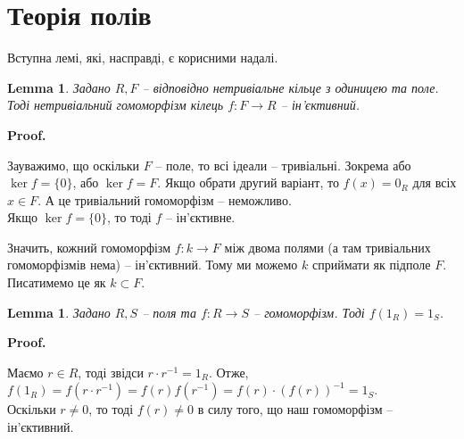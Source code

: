 \documentclass[a4paper, 10pt]{article}
\makeatletter
\theoremstyle{theoremdd}
\theoremstyle{theoremdd}
\theoremstyle{theoremdd}
\theoremstyle{theoremdd}
\theoremstyle{theoremdd}
\theoremstyle{theoremdd}
\theoremstyle{theoremdd}
\theoremstyle{theoremdd}
\theoremstyle{theoremdd}
\theoremstyle{theoremdd}
\theoremstyle{theoremdd}
\theoremstyle{theoremdd}
\theoremstyle{theoremdd}
\newtheorem{lemma}[theorem]{Lemma}
\theoremstyle{theoremdd}
\theoremstyle{theoremdd}
\renewenvironment{proof}[1][Proof.\\]{\par
\pushQED{\hfill \qed}%
\normalfont \topsep6\p@\@plus6\p@\relax
\trivlist
\item\relax
{\bfseries
#1\@addpunct{.}}\hspace\labelsep\ignorespaces
}{%
\popQED\endtrivlist\@endpefalse
}
\makeatother
\begin{document}
\section{Теорія полів}
Вступна лемі, які, насправді, є корисними надалі.

\begin{lemma}
Задано $R,F$ -- відповідно нетривіальне кільце з одиницею та поле. Тоді нетривіальний гомоморфізм кілець $f \colon F \to R$ -- ін'єктивний.
\end{lemma}

\begin{proof}
Зауважимо, що оскільки $F$ -- поле, то всі ідеали -- тривіальні. Зокрема або $\ker f = \{0\}$, або $\ker f = F$. Якщо обрати другий варіант, то $f(x) = 0_R$ для всіх $x \in F$. А це тривіальний гомоморфізм -- неможливо.\\
Якщо $\ker f = \{0\}$, то тоді $f$ -- ін'єктивне.
\end{proof}

Значить, кожний гомоморфізм $f \colon k \to F$ між двома полями (а там тривіальних гомоморфізмів нема) -- ін'єктивний. Тому ми можемо $k$ сприймати як підполе $F$. Писатимемо це як $k \subset F$.

\begin{lemma}
Задано $R,S$ -- поля та $f \colon R \to S$ -- гомоморфізм. Тоді $f(1_R) = 1_S$.
\end{lemma}

\begin{proof}
Маємо $r \in R$, тоді звідси $r \cdot r^{-1} = 1_R$. Отже,\\
$f(1_R) = f(r \cdot r^{-1}) = f(r) f(r^{-1}) = f(r) \cdot (f(r))^{-1} = 1_S$.\\
Оскільки $r \neq 0$, то тоді $f(r) \neq 0$ в силу того, що наш гомоморфізм -- ін'єктивний.
\end{proof}

\newpage
\end{document}
